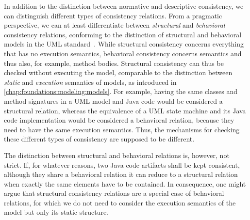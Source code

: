 In addition to the distinction between normative and descriptive consistency, we can distinguish different types of consistency relations.
From a pragmatic perspective, we can at least differentiate between \emph{structural} and \emph{behavioral} consistency relations, conforming to the distinction of structural and behavioral models in the \gls{UML} standard~\cite{uml}.
While structural consistency concerns everything that has no execution semantics, behavioral consistency concerns semantics and thus also, for example, method bodies.
Structural consistency can thus be checked without executing the model, comparable to the distinction between \emph{static} and \emph{execution} semantics of models, as introduced in \autoref{chap:foundations:modeling:models}.
For example, having the same classes and method signatures in a \gls{UML} model and Java code would be considered a structural relation, whereas the equivalence of a \gls{UML} state machine and its Java code implementation would be considered a behavioral relation, because they need to have the same execution semantics.
Thus, the mechanisms for checking these different types of consistency are supposed to be different.

The distinction between structural and behavioral relations is, however, not strict.
If, for whatever reasons, two Java code artifacts shall be kept consistent, although they share a behavioral relation it can reduce to a structural relation when exactly the same elements have to be contained.
In consequence, one might argue that structural consistency relations are a special case of behavioral relations, for which we do not need to consider the execution semantics of the model but only its static structure.

